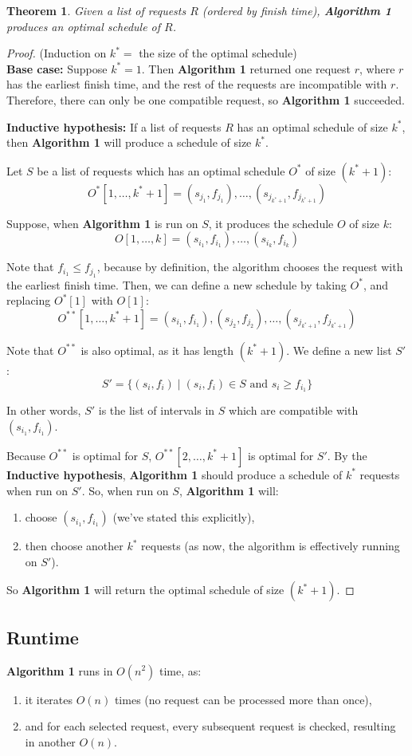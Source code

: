 \documentclass[11pt]{article}
\theoremstyle{plain}
\newtheorem{thm}{Theorem}
\theoremstyle{definition}
\begin{document}
\begin{thm}
    Given a list of requests $R$ (ordered by finish time), \textbf{Algorithm 1} produces an optimal schedule of $R$.
\end{thm}

\begin{proof}
    (Induction on $k^* = $ the size of the optimal schedule)\\
    \indent\textbf{Base case:}
    Suppose $k^* = 1$. Then {\bf Algorithm 1} returned one request $r$, where $r$ has the earliest 
    finish time, and the rest of the requests are incompatible with $r$. Therefore, there can only be
    one compatible request, so {\bf Algorithm 1} succeeded.
    \bigbreak

    \textbf{Inductive hypothesis:}
    If a list of requests $R$ has an optimal schedule of size $k^*$, then {\bf Algorithm 1} will produce
    a schedule of size $k^*$.
    \bigbreak

    Let $S$ be a list of requests which has an optimal schedule $O^*$ of size $(k^* + 1)$:
    $$O^*[1, \ldots, k^* + 1] = (s_{j_1}, f_{j_1}), \ldots, (s_{j_{k^* + 1}}, f_{j_{k^* + 1}})$$

    Suppose, when \textbf{Algorithm 1} is run on $S$, it produces the schedule $O$ of size $k$:
    $$O[1, \ldots, k] = (s_{i_1}, f_{i_1}), \ldots, (s_{i_k}, f_{i_k})$$

    Note that $f_{i_1} \leq f_{j_1}$, because by definition, the algorithm chooses the request with the earliest 
    finish time. Then, we can define a new schedule by taking $O^*$, and replacing $O^*[1]$ with $O[1]$:
    $$O^{**}[1, \ldots, k^* + 1] = (s_{i_1}, f_{i_1}), (s_{j_2}, f_{j_2}), \ldots, (s_{j_{k^* + 1}}, f_{j_{k^* + 1}})$$

    Note that $O^{**}$ is also optimal, as it has length $(k^* + 1)$. We define a new list $S'$:
    $$S' = \{(s_i, f_i) \mid (s_i, f_i) \in S \text{ and } s_i \geq f_{i_1}\}$$

    In other words, $S'$ is the list of intervals in $S$ which are compatible with $(s_{i_1}, f_{i_1})$.

    Because $O^{**}$ is optimal for $S$, $O^{**}[2, \ldots, k^* + 1]$ is optimal for $S'$. By the 
    \textbf{Inductive hypothesis}, \textbf{Algorithm 1} should produce a schedule of $k^*$ requests when 
    run on $S'$. So, when run on $S$, \textbf{Algorithm 1} will:
    \begin{enumerate}
        \item choose $(s_{i_1}, f_{i_1})$ (we've stated this explicitly),
        \item then choose another $k^*$ requests (as now, the algorithm is effectively running on $S'$).
    \end{enumerate}
    So \textbf{Algorithm 1} will return the optimal schedule of size $(k^* + 1)$.
\end{proof}

\subsection{Runtime}

\textbf{Algorithm 1} runs in $O(n^2)$ time, as:
\begin{enumerate}
    \item it iterates $O(n)$ times (no request can be processed more than once),
    \item and for each selected request, every subsequent request is checked, resulting in another $O(n)$.
\end{enumerate}
\end{document}
